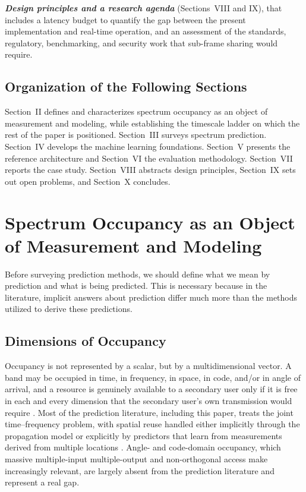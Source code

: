 \documentclass[lettersize,journal]{IEEEtran}
\begin{document}
\textbf{\emph{Design principles and a research agenda}}
(Sections~VIII and IX), that includes a latency budget to quantify
the gap between the present implementation and real-time operation, and
an assessment of the standards, regulatory, benchmarking, and security
work that sub-frame sharing would require.

\subsection{\textbf{Organization of the Following Sections}}
Section~II defines and characterizes spectrum occupancy as an object of
measurement and modeling, while establishing the timescale ladder on which
the rest of the paper is positioned. Section~III surveys spectrum
prediction. Section~IV develops the machine learning foundations.
Section~V presents the reference architecture and Section~VI the
evaluation methodology. Section~VII reports the case study.
Section~VIII abstracts design principles, Section~IX sets out
open problems, and Section~X concludes.

\section{\textbf{Spectrum Occupancy as an Object of Measurement and Modeling}}

Before surveying prediction methods, we should define what
we mean by prediction and what is being predicted.
This is necessary because in the literature, implicit 
answers about prediction differ much more than the 
methods utilized to derive these predictions.
\subsection{\textbf{Dimensions of Occupancy}}
Occupancy is not represented by a scalar, but 
by a multidimensional vector.
A band may be occupied in time, in frequency,
in space, in code, and/or in angle of arrival, 
and a resource is genuinely
available to a secondary user only if it is free 
in each and every dimension that
the secondary user's own transmission would require \cite{Yucek2009}.
Most of the prediction literature, including this paper, treats the joint
time--frequency problem, with spatial reuse handled either implicitly
through the propagation model or explicitly by predictors that learn from
measurements derived from multiple locations \cite{Li2021, Ren2021, Shawel2019}.
Angle- and code-domain occupancy, which massive multiple-input
multiple-output and non-orthogonal access make increasingly relevant,
are largely absent from the prediction literature and represent a real
gap.
\end{document}
